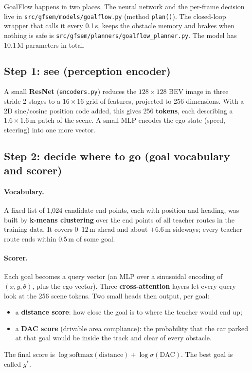 \documentclass[11pt,a4paper]{article}
\newcommand{\code}[1]{\texttt{#1}}
\newcommand{\term}[1]{\textbf{#1}}
\begin{document}
GoalFlow happens in two places. The neural network and the per-frame decision live in
\code{src/gfsem/models/goalflow.py} (method \code{plan()}). The closed-loop wrapper that calls it every
0.1\,s, keeps the obstacle memory and brakes when nothing is safe is
\code{src/gfsem/planners/goalflow\_planner.py}. The model has 10.1\,M parameters in total.

\subsection{Step 1: see (perception encoder)}
A small \term{ResNet} (\code{encoders.py}) reduces the $128\times128$ BEV image in three stride-2 stages to
a $16\times16$ grid of features, projected to 256 dimensions. With a 2D sine/cosine position code added,
this gives 256 \term{tokens}, each describing a $1.6\times1.6$\,m patch of the scene. A small MLP encodes
the ego state (speed, steering) into one more vector.

\subsection{Step 2: decide where to go (goal vocabulary and scorer)}
\paragraph{Vocabulary.} A fixed list of 1{,}024 candidate end points, each with position and heading, was
built by \term{k-means clustering} over the end points of all teacher routes in the training data. It
covers 0--12\,m ahead and about $\pm6.6$\,m sideways; every teacher route ends within 0.5\,m of some goal.

\paragraph{Scorer.} Each goal becomes a query vector (an MLP over a sinusoidal encoding of $(x,y,\theta)$,
plus the ego vector). Three \term{cross-attention} layers let every query look at the 256 scene tokens.
Two small heads then output, per goal:
\begin{itemize}[nosep]
  \item a \term{distance score}: how close the goal is to where the teacher would end up;
  \item a \term{DAC score} (drivable area compliance): the probability that the car parked at that goal
        would be inside the track and clear of every obstacle.
\end{itemize}
The final score is $\log \mathrm{softmax}(\text{distance}) + \log \sigma(\text{DAC})$. The best goal is
called $g^*$.
\end{document}

